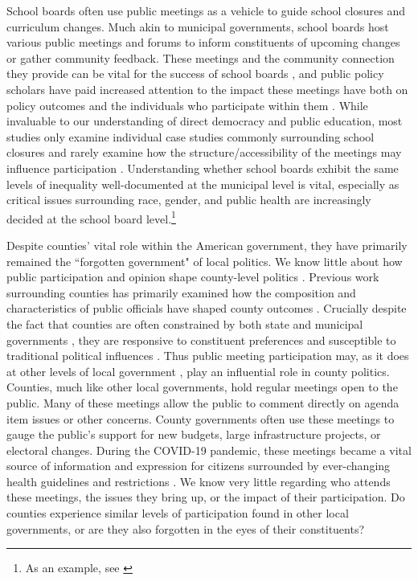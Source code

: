     School boards often use public meetings as a vehicle to guide school closures and curriculum changes. Much akin to municipal governments, school boards host various public meetings and forums to inform constituents of upcoming changes or gather community feedback. These meetings and the community connection they provide can be vital for the success of school boards \citep{morelHowCommunityEngagement2021,stoneCivicCapacityUrban2001,tracySpeakingOutPublic2007}, and public policy scholars have paid increased attention to the impact these meetings have both on policy outcomes \citep{morelTakeoverRaceEducation2018,hartneyPoliticsMarketsPandemics2022} and the individuals who participate within them \citep{nuamahCostParticipatingPoor2021,collinsDoesMeetingStyle2021,nuamahCloseHomePlaceBased2021}. While invaluable to our understanding of direct democracy and public education, most studies only examine individual case studies commonly surrounding school closures and rarely examine how the structure/accessibility of the meetings may influence participation \citep[although see][]{collinsDoesMeetingStyle2021}. Understanding whether school boards exhibit the same levels of inequality well-documented at the municipal level is vital, especially as critical issues surrounding race, gender, and public health are increasingly decided at the school board level.\footnote{As an example, see \citet{hartneyPoliticsMarketsPandemics2022}}

    Despite counties' vital role within the American government, they have primarily remained the ``forgotten government" of local politics. We know little about how public participation and opinion shape county-level politics \citep{bentonAssessmentResearchAmerican2005a}. Previous work surrounding counties has primarily examined how the composition and characteristics of public officials have shaped county outcomes \citep[e.g.,][]{mohrStrategicSpendingDoes2019}. Crucially despite the fact that counties are often constrained by both state and municipal governments \citep{petersonCityLimits1981}, they are responsive to constituent preferences and susceptible to traditional political influences \citep{debenedictis-kessnerPoliticsForgottenGovernments2020}. Thus public meeting participation may, as it does at other levels of local government \citep{einsteinWhoParticipatesLocal2019}, play an influential role in county politics. Counties, much like other local governments, hold regular meetings open to the public. Many of these meetings allow the public to comment directly on agenda item issues or other concerns. County governments often use these meetings to gauge the public's support for new budgets, large infrastructure projects, or electoral changes. During the COVID-19 pandemic, these meetings became a vital source of information and expression for citizens surrounded by ever-changing health guidelines and restrictions \citep{lynchPandemicPolitics2022}. We know very little regarding who attends these meetings, the issues they bring up, or the impact of their participation. Do counties experience similar levels of participation found in other local governments, or are they also forgotten in the eyes of their constituents?

